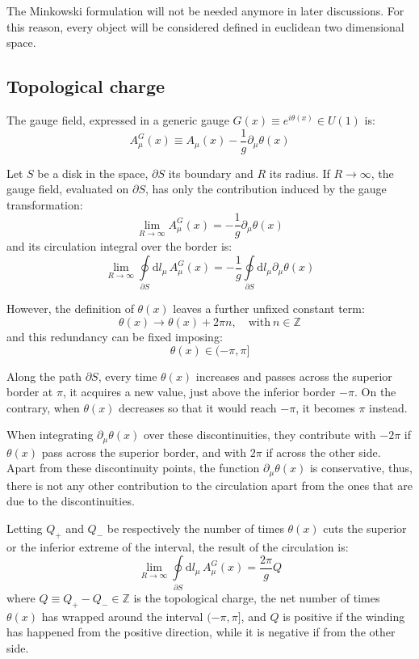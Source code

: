 The Minkowski formulation will not be needed anymore in later discussions.
For this reason, every object will be considered defined in euclidean two dimensional space.

\subsection*{Topological charge}

The gauge field, expressed in a generic gauge $G(x) \equiv e^{i\theta(x)} \in U(1)$ is:
\[
    A^G_\mu(x) \equiv A_\mu(x) - \frac{1}{g}\partial_\mu\theta(x)
\]

Let $S$ be a disk in the space, $\partial S$ its boundary and $R$ its radius.
If $R \to \infty$, the gauge field, evaluated on $\partial S$,
has only the contribution induced by the gauge transformation:
\[
    \lim_{R\to\infty}A^G_\mu(x) = -\frac{1}{g}\partial_\mu\theta(x)
\]
and its circulation integral over the border is:
\[
    \lim_{R\to\infty}\oint\limits_{\partial S}\mathrm dl_\mu\,A^G_\mu(x) = -\frac{1}{g}\oint\limits_{\partial S}\mathrm dl_\mu\partial_\mu\theta(x)
\]

However, the definition of $\theta(x)$ leaves a further unfixed constant term:
\[
    \theta(x) \rightarrow \theta(x) + 2\pi n, \quad \text{with}\ n \in \mathbb Z
\]
and this redundancy can be fixed imposing:
\[
    \theta(x) \in (-\pi,\pi]
\]

Along the path $\partial S$, every time $\theta(x)$ increases and passes across the superior border at $\pi$, it acquires a new value,
just above the inferior border $-\pi$.
On the contrary, when $\theta(x)$ decreases so that it would reach $-\pi$, it becomes $\pi$ instead.

When integrating $\partial_\mu\theta(x)$ over these discontinuities,
they contribute with $-2\pi$ if $\theta(x)$ pass across the superior border, and with $2\pi$ if across the other side.
Apart from these discontinuity points, the function $\partial_\mu\theta(x)$ is conservative, thus,
there is not any other contribution to the circulation apart from the ones that are due to the discontinuities.

Letting $Q_+$ and $Q_-$ be respectively the number of times $\theta(x)$ cuts the superior or the inferior extreme of the interval,
the result of the circulation is:
\[
    \lim_{R\to\infty}\oint\limits_{\partial S}\mathrm dl_\mu\,A^G_\mu(x) = \frac{2\pi}{g} Q
\]
where $Q \equiv Q_+ - Q_- \in \mathbb Z$ is the topological charge, \ie the net number of times $\theta(x)$ has wrapped around the interval $(-\pi,\pi]$,
and $Q$ is positive if the winding has happened from the positive direction, while it is negative if from the other side.

